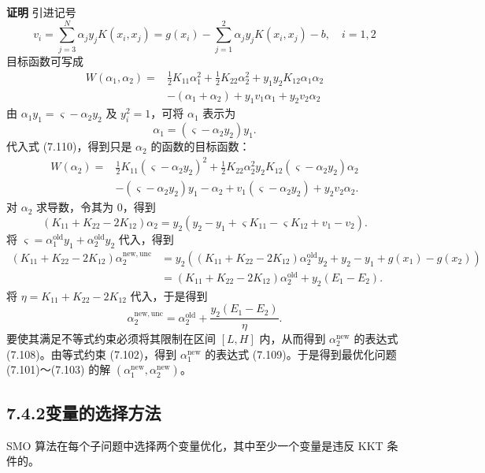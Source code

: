 \documentclass[UTF8,12pt,a4paper,fontset=fandol]{ctexart}
\begin{document}
\noindent\textbf{证明}\quad
引进记号
\[
v_i=\sum_{j=3}^N\alpha_jy_jK(x_i,x_j)=g(x_i)-\sum_{j=1}^2\alpha_jy_jK(x_i,x_j)-b,\quad i=1,2
\]
目标函数可写成
\begin{equation}
\begin{aligned}
W(\alpha_1,\alpha_2)=&
\frac{1}{2}K_{11}\alpha_1^2+\frac{1}{2}K_{22}\alpha_2^2+y_1y_2K_{12}\alpha_1\alpha_2\\
&-(\alpha_1+\alpha_2)+y_1v_1\alpha_1+y_2v_2\alpha_2
\end{aligned}
\tag{7.110}
\end{equation}
由 $\alpha_1y_1=\varsigma-\alpha_2y_2$ 及 $y_i^2=1$，可将 $\alpha_1$ 表示为
\[
\alpha_1=(\varsigma-\alpha_2y_2)y_1.
\]
代入式 (7.110)，得到只是 $\alpha_2$ 的函数的目标函数：
\[
\begin{aligned}
W(\alpha_2)=&
\frac{1}{2}K_{11}(\varsigma-\alpha_2y_2)^2+\frac{1}{2}K_{22}\alpha_2^2
y_2K_{12}(\varsigma-\alpha_2y_2)\alpha_2\\
&-(\varsigma-\alpha_2y_2)y_1-\alpha_2+v_1(\varsigma-\alpha_2y_2)+y_2v_2\alpha_2.
\end{aligned}
\]
对 $\alpha_2$ 求导数，令其为 0，得到
\[
(K_{11}+K_{22}-2K_{12})\alpha_2
=y_2(y_2-y_1+\varsigma K_{11}-\varsigma K_{12}+v_1-v_2).
\]
将 $\varsigma=\alpha_1^{\mathrm{old}}y_1+\alpha_2^{\mathrm{old}}y_2$ 代入，得到
\[
\begin{aligned}
(K_{11}+K_{22}-2K_{12})\alpha_2^{\mathrm{new,unc}}
&=y_2\left((K_{11}+K_{22}-2K_{12})\alpha_2^{\mathrm{old}}y_2+y_2-y_1+g(x_1)-g(x_2)\right)\\
&=(K_{11}+K_{22}-2K_{12})\alpha_2^{\mathrm{old}}+y_2(E_1-E_2).
\end{aligned}
\]
将 $\eta=K_{11}+K_{22}-2K_{12}$ 代入，于是得到
\[
\alpha_2^{\mathrm{new,unc}}=\alpha_2^{\mathrm{old}}+\frac{y_2(E_1-E_2)}{\eta}.
\]
要使其满足不等式约束必须将其限制在区间 $[L,H]$ 内，从而得到 $\alpha_2^{\mathrm{new}}$ 的表达式 (7.108)。由等式约束 (7.102)，得到 $\alpha_1^{\mathrm{new}}$ 的表达式 (7.109)。于是得到最优化问题 (7.101)～(7.103) 的解 $(\alpha_1^{\mathrm{new}},\alpha_2^{\mathrm{new}})$。

\subsection*{7.4.2\quad 变量的选择方法}

SMO 算法在每个子问题中选择两个变量优化，其中至少一个变量是违反 KKT 条件的。
\end{document}
